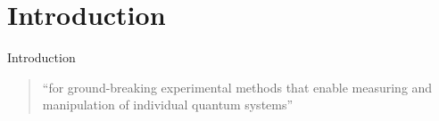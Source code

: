 \section{Introduction}

\begin{frame}{Introduction}
  \begin{minipage}[t][4.5cm][t]{\textwidth}


  \end{minipage}
  \vspace{.5cm}
  \begin{center}
    \begin{quote}
      ``for ground-breaking experimental methods that enable measuring and
      manipulation of individual quantum systems''
    \end{quote} 
  \end{center} 
\end{frame}
